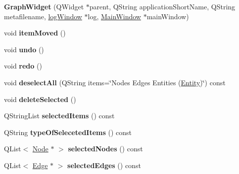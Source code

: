 \begin{DoxyCompactItemize}
\item 
\mbox{\label{class_graph_widget_aef9c79d5d073072f36eb0b3dde3ed5eb}} 
{\bfseries Graph\+Widget} (Q\+Widget $\ast$parent, Q\+String application\+Short\+Name, Q\+String metafilename, \hyperlink{classlog_window}{log\+Window} $\ast$log, \hyperlink{class_main_window}{Main\+Window} $\ast$main\+Window)
\item 
\mbox{\label{class_graph_widget_a3151de180b65d71f424aba5bc274978e}} 
void {\bfseries item\+Moved} ()
\item 
\mbox{\label{class_graph_widget_abed30d75072287b9ad60c7e4a4eefe44}} 
void {\bfseries undo} ()
\item 
\mbox{\label{class_graph_widget_ad0f40cc5d665cf71f0ec8edab01e020f}} 
void {\bfseries redo} ()
\item 
\mbox{\label{class_graph_widget_a4635bed9ea5ddbfe0085c82a65781adf}} 
void {\bfseries deselect\+All} (Q\+String items=\char`\"{}Nodes Edges Entities (\hyperlink{class_entity}{Entity})\char`\"{}) const
\item 
\mbox{\label{class_graph_widget_a0e90eeed7cc2d948f3a7e89954a6ef69}} 
void {\bfseries delete\+Selected} ()
\item 
\mbox{\label{class_graph_widget_ac6e7cb4d92f226ba931a136c33fe887a}} 
Q\+String\+List {\bfseries selected\+Items} () const
\item 
\mbox{\label{class_graph_widget_abacd01d2946e304ed433a8bb59c1250c}} 
Q\+String {\bfseries type\+Of\+Seleceted\+Items} () const
\item 
\mbox{\label{class_graph_widget_a84ad6e8fe26027632744d37ee41197b0}} 
Q\+List$<$ \hyperlink{class_node}{Node} $\ast$ $>$ {\bfseries selected\+Nodes} () const
\item 
\mbox{\label{class_graph_widget_ad33db964dd1fa6bf9ed574bf04fd3d43}} 
Q\+List$<$ \hyperlink{class_edge}{Edge} $\ast$ $>$ {\bfseries selected\+Edges} () const

\end{DoxyCompactItemize}
